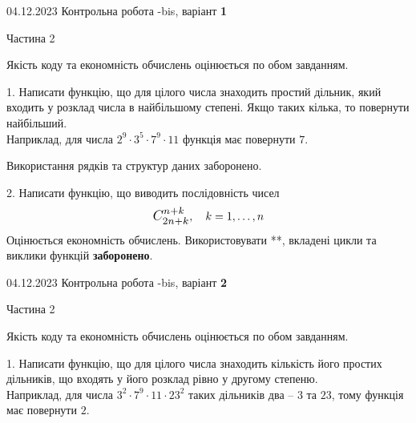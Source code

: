 \documentclass[12pt, ukrainian]{article}
\begin{document}
\begin {Huge}
{{04.12.2023 Контрольна робота -bis, варіант  \No \textbf { 1 }\par}}

\begin{center}Частина 2
\end{center}
\vspace{10mm}
\end {Huge}

{
\begin {Large}
Якість коду та економність обчислень оцінюється по обом завданням. 

\vspace{5mm}

1. Написати функцію, що для цілого числа знаходить простий дільник, який входить у розклад числа в найбільшому степені. Якщо таких кілька, то повернути найбільший. \\ Наприклад, для числа $2^{9}{\cdot}3^5{\cdot}7^9{\cdot}11$ функція має повернути $7$.

 Використання рядків та структур даних заборонено. 



\vspace{10mm}



2. 
Написати функцію, що виводить послідовність чисел
$$\scalebox{1.2}{$C_{2n+k}^{n+k}$}, \quad k=1,\ldots,n$$
Оцінюється економність обчислень. Використовувати **, вкладені цикли та виклики функцій \textbf{заборонено}.

\end{Large}\newpage




\begin {Huge}
{{04.12.2023 Контрольна робота -bis, варіант  \No \textbf { 2 }\par}}

\begin{center}Частина 2
\end{center}
\vspace{10mm}
\end {Huge}

{
\begin {Large}
Якість коду та економність обчислень оцінюється по обом завданням. 

\vspace{5mm}

1. Написати функцію, що для цілого числа знаходить кількість його простих дільників, що входять у його розклад рівно у другому степеню. \\ Наприклад, для числа $3^2{\cdot}7^9{\cdot}11{\cdot}23^{2}$ таких дільників два – $3$ та $23$, тому функція має повернути $2$.


\end{Large}}}
\end{document}
